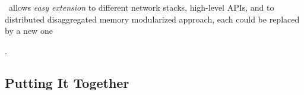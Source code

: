 
\sys\ allows \textit{easy extension} to different network stacks, high-level APIs, and to distributed disaggregated memory
modularized approach, each could be replaced by a new one

\textit{}.

\subsection{Putting It Together}
